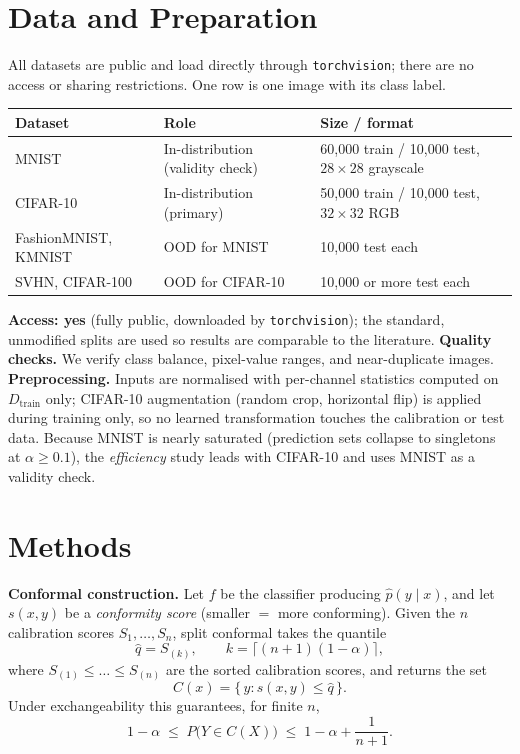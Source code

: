 \documentclass{article}
\begin{document}
\section{Data and Preparation}
All datasets are public and load directly through \texttt{torchvision}; there are no access or
sharing restrictions. One row is one image with its class label.

\begin{center}
\small
\renewcommand{\arraystretch}{1.2}
\begin{tabular}{p{2.8cm}p{3.9cm}p{5.5cm}}
\toprule
\textbf{Dataset} & \textbf{Role} & \textbf{Size / format} \\
\midrule
MNIST            & In-distribution (validity check) & 60{,}000 train / 10{,}000 test, $28\times28$ grayscale \\
CIFAR-10         & In-distribution (primary)        & 50{,}000 train / 10{,}000 test, $32\times32$ RGB \\
FashionMNIST, KMNIST & OOD for MNIST                & 10{,}000 test each \\
SVHN, CIFAR-100  & OOD for CIFAR-10                 & 10{,}000 or more test each \\
\bottomrule
\end{tabular}
\end{center}

\textbf{Access: yes} (fully public, downloaded by \texttt{torchvision}); the standard, unmodified
splits are used so results are comparable to the literature. \textbf{Quality checks.} We verify class
balance, pixel-value ranges, and near-duplicate images. \textbf{Preprocessing.} Inputs are normalised
with per-channel statistics computed on $D_{\text{train}}$ only; CIFAR-10 augmentation (random crop,
horizontal flip) is applied during training only, so no learned transformation touches the
calibration or test data. Because MNIST is nearly saturated (prediction sets collapse to singletons
at $\alpha\ge0.1$), the \emph{efficiency} study leads with CIFAR-10 and uses MNIST as a validity
check.

\section{Methods}
\textbf{Conformal construction.} Let $f$ be the classifier producing $\hat p(y\mid x)$, and let
$s(x,y)$ be a \emph{conformity score} (smaller $=$ more conforming). Given the $n$ calibration scores
$S_1,\dots,S_n$, split conformal takes the quantile
\begin{equation}
  \hat q = S_{(k)}, \qquad k=\big\lceil (n+1)(1-\alpha)\big\rceil,
  \label{eq:quantile}
\end{equation}
where $S_{(1)}\le\dots\le S_{(n)}$ are the sorted calibration scores, and returns the set
\begin{equation}
  C(x)=\{\,y : s(x,y)\le \hat q\,\}.
  \label{eq:set}
\end{equation}
Under exchangeability this guarantees, for finite $n$,
\begin{equation}
  1-\alpha \;\le\; P\big(Y\in C(X)\big) \;\le\; 1-\alpha+\frac{1}{n+1}.
  \label{eq:bound}
\end{equation}
\end{document}
